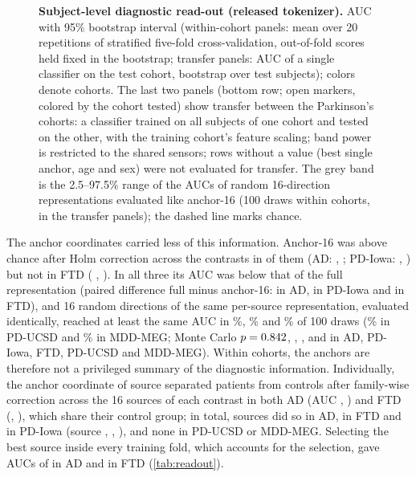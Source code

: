 \documentclass[10pt,letterpaper]{article}
\begin{document}
\begin{figure}[!ht]
\caption{{\bf Subject-level diagnostic read-out (released tokenizer).}
AUC with 95\% bootstrap interval
  (within-cohort panels: mean over 20 repetitions of stratified five-fold cross-validation, out-of-fold
  scores held fixed in the bootstrap; transfer panels: AUC of a single classifier on the test cohort,
  bootstrap over test subjects); colors denote cohorts. The last two panels (bottom row; open
  markers, colored by the cohort tested) show transfer between the Parkinson's cohorts: a classifier
  trained on all subjects of one cohort and tested on the other, with the training cohort's feature
  scaling; band power is restricted to the shared sensors; rows without a value (best single anchor,
  age and sex) were not evaluated for transfer. The grey band is the 2.5--97.5\% range of the AUCs of
  random 16-direction representations evaluated like anchor-16 (100 draws within cohorts,
  \TransferIowaToUCSDRandN{} in the transfer panels); the dashed line marks chance.}
\label{fig:readout}
\end{figure}



The anchor coordinates carried less of this information. Anchor-16 was above chance after Holm
correction across the \NumContrasts{} contrasts in \AnchorSignificantCount{} of them (AD:
\AnchorADAUC{} \AnchorADCI, \AnchorADPHolm; PD-Iowa: \AnchorIowaPDAUC{} \AnchorIowaPDCI,
\AnchorIowaPDPHolm) but not in FTD (\AnchorFTDAUC{} \AnchorFTDCI, \AnchorFTDPHolm). In all three
its AUC was below that of the full representation (paired difference full minus anchor-16:
\PairedFullAnchorAD{} \PairedFullAnchorADCI{} in AD, \PairedFullAnchorIowaPD{}
\PairedFullAnchorIowaPDCI{} in PD-Iowa and \PairedFullAnchorFTD{} \PairedFullAnchorFTDCI{} in FTD),
and 16 random directions of the same per-source representation, evaluated identically, reached at
least the same AUC in \RandADGePct\%, \RandIowaPDGePct\% and \RandFTDGePct\% of 100 draws
(\RandUCSDPDGePct\% in PD-UCSD and \RandMDDGePct\% in MDD-MEG; Monte Carlo $p=0.842$, \RandIowaPDMCP,
\RandFTDMCP, \RandUCSDPDMCP{} and \RandMDDMCP{} in AD, PD-Iowa, FTD, PD-UCSD and MDD-MEG). Within cohorts, the anchors are therefore not a privileged summary of the diagnostic
information. Individually, the
anchor coordinate of source \SingleADBestSource{} separated patients from controls after
family-wise correction across the 16 sources of each contrast in both AD (AUC \SingleADBestAUC,
\SingleADMinP) and FTD (\SingleFTDBestAUC, \SingleFTDMinP), which share their control group; in
total, \SingleADSigCount{} sources did so in AD, \SingleFTDSigCount{} in FTD and
\SingleIowaPDSigCount{} in PD-Iowa (source \SingleIowaPDBestSource, \SingleIowaPDBestAUC,
\SingleIowaPDMinP), and none in PD-UCSD or MDD-MEG. Selecting the best source inside every training
fold, which accounts for the selection, gave AUCs of \BestSingleADAUC{} in AD and \BestSingleFTDAUC{}
in FTD (\cref{tab:readout}).
\end{document}
